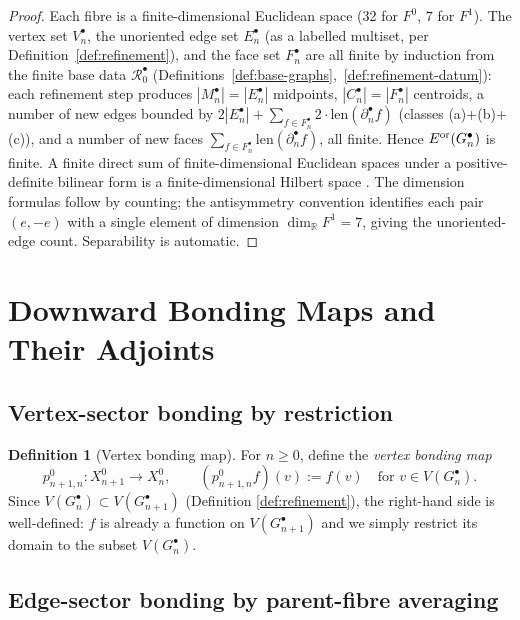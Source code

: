 \documentclass[11pt, a4paper]{amsart}
\theoremstyle{definition}
\newtheorem{definition}[theorem]{Definition}
\newcommand{\R}{\mathbb{R}}
\begin{document}
\begin{proof}
Each fibre is a finite-dimensional Euclidean space (32 for $F^0$,
$7$ for $F^1$). The vertex set $V_n^\bullet$, the unoriented edge
set $E_n^\bullet$ (as a labelled multiset, per
Definition~\ref{def:refinement}), and the face set $F_n^\bullet$
are all finite by induction from the finite base data
$\mathcal{R}_0^\bullet$
(Definitions~\ref{def:base-graphs},~\ref{def:refinement-datum}):
each refinement step produces $|M_n^\bullet| = |E_n^\bullet|$
midpoints, $|C_n^\bullet| = |F_n^\bullet|$ centroids, a number of
new edges bounded by $2|E_n^\bullet| + \sum_{f \in F_n^\bullet}
2 \cdot \mathrm{len}(\partial_n^\bullet f)$ (classes
(a)+(b)+(c)), and a number of new faces $\sum_{f \in F_n^\bullet}
\mathrm{len}(\partial_n^\bullet f)$, all finite. Hence
$E^{\rm or}(G_n^\bullet)$ is finite.
A finite direct sum of finite-dimensional Euclidean spaces under
a positive-definite bilinear form is a finite-dimensional Hilbert
space \cite[Ch.~II]{ReedSimonI}. The dimension formulas follow by
counting; the antisymmetry convention identifies each pair
$(e, -e)$ with a single element of dimension $\dim_\R F^1 = 7$,
giving the unoriented-edge count.
Separability is automatic.
\end{proof}

\section{Downward Bonding Maps and Their Adjoints}
\label{sec:bonding}

\subsection{Vertex-sector bonding by restriction}

\begin{definition}[Vertex bonding map]
\label{def:p0}
For $n \geq 0$, define the \emph{vertex bonding map}
\[
  p_{n+1, n}^0 \colon X_{n+1}^0 \to X_n^0, \qquad
    (p_{n+1, n}^0 f)(v) := f(v) \quad \text{for } v \in V(G_n^
    \bullet).
\]
Since $V(G_n^\bullet) \subset V(G_{n+1}^\bullet)$ (Definition
\ref{def:refinement}), the right-hand side is well-defined: $f$ is
already a function on $V(G_{n+1}^\bullet)$ and we simply restrict
its domain to the subset $V(G_n^\bullet)$.
\end{definition}

\subsection{Edge-sector bonding by parent-fibre averaging}
\end{document}
